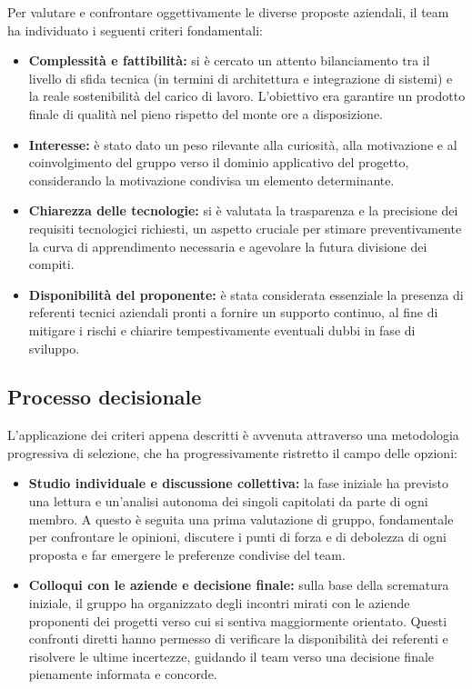 \documentclass[a4paper,12pt]{article}
\begin{document}
Per valutare e confrontare oggettivamente le diverse proposte aziendali, il team ha individuato i seguenti criteri fondamentali:

\begin{itemize}
    \item \textbf{Complessità e fattibilità:} si è cercato un attento bilanciamento tra il livello di sfida tecnica (in termini di architettura e integrazione di sistemi) e la reale sostenibilità del carico di lavoro. L'obiettivo era garantire un prodotto finale di qualità nel pieno rispetto del monte ore a disposizione.
    \item \textbf{Interesse:} è stato dato un peso rilevante alla curiosità, alla motivazione e al coinvolgimento del gruppo verso il dominio applicativo del progetto, considerando la motivazione condivisa un elemento determinante.
    \item \textbf{Chiarezza delle tecnologie:} si è valutata la trasparenza e la precisione dei requisiti tecnologici richiesti, un aspetto cruciale per stimare preventivamente la curva di apprendimento necessaria e agevolare la futura divisione dei compiti.
    \item \textbf{Disponibilità del proponente:} è stata considerata essenziale la presenza di referenti tecnici aziendali pronti a fornire un supporto continuo, al fine di mitigare i rischi e chiarire tempestivamente eventuali dubbi in fase di sviluppo.
\end{itemize}

\subsection{Processo decisionale}

L'applicazione dei criteri appena descritti è avvenuta attraverso una metodologia progressiva di selezione, che ha progressivamente ristretto il campo delle opzioni:

\begin{itemize}
    \item \textbf{Studio individuale e discussione collettiva:} la fase iniziale ha previsto una lettura e un'analisi autonoma dei singoli capitolati da parte di ogni membro. A questo è seguita una prima valutazione di gruppo, fondamentale per confrontare le opinioni, discutere i punti di forza e di debolezza di ogni proposta e far emergere le preferenze condivise del team.
    \item \textbf{Colloqui con le aziende e decisione finale:} sulla base della scrematura iniziale, il gruppo ha organizzato degli incontri mirati con le aziende proponenti dei progetti verso cui si sentiva maggiormente orientato. Questi confronti diretti hanno permesso di verificare la disponibilità dei referenti e risolvere le ultime incertezze, guidando il team verso una decisione finale pienamente informata e concorde.
\end{itemize}
\end{document}
